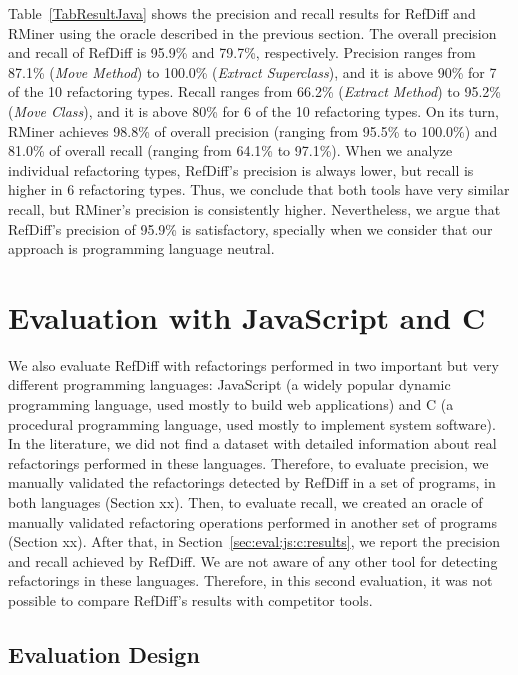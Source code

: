 Table~\ref{TabResultJava} shows the precision and recall results for RefDiff and RMiner using the oracle described in the previous section. The overall precision and recall of RefDiff is 95.9\% and 79.7\%, respectively.
Precision ranges from 87.1\% (\emph{Move Method}) to 100.0\% (\emph{Extract Superclass}), and it is above 90\% for 7 of the 10 refactoring types.
Recall ranges from 66.2\% (\emph{Extract Method}) to 95.2\% (\emph{Move Class}), and it is above 80\% for 6 of the 10 refactoring types.
On its turn, RMiner achieves 98.8\% of overall precision (ranging from 95.5\% to 100.0\%) and 81.0\% of overall recall (ranging from 64.1\% to 97.1\%).
When we analyze individual refactoring types, RefDiff's precision is always lower, but recall is higher in 6 refactoring types.
Thus, we conclude that both tools have very similar recall, but RMiner's precision is consistently higher.
Nevertheless, we argue that RefDiff's precision of 95.9\% is satisfactory, specially when we consider that our approach is programming language neutral.


\section{Evaluation with JavaScript and C}
\label{sec:eval:js:c:reults}

We also evaluate RefDiff with refactorings performed in two important but very different programming languages: JavaScript (a widely popular dynamic programming language, used mostly to build web applications) and C (a procedural programming language, used mostly to implement system software).
In the literature, we did not find a dataset with detailed information about real refactorings performed in these languages. Therefore, to evaluate precision, we manually validated the refactorings detected by RefDiff in a set of programs, in both languages (Section xx). Then, to evaluate recall, we created an oracle of manually validated refactoring operations performed in another set of programs (Section xx).  After that, in Section~\ref{sec:eval:js:c:results}, we report the precision and recall achieved by RefDiff.  We are not aware of any other tool for detecting refactorings in these languages. Therefore, in this second evaluation, it was not possible to compare RefDiff's results with competitor tools.

\subsection{Evaluation Design}
\label{sec:eval:js:c:design}

